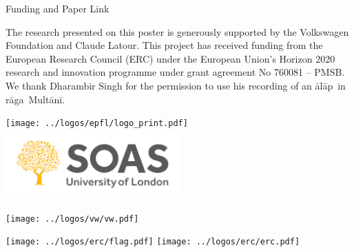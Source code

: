 \documentclass[final]{beamer}
\newcommand{\raga}{r\=aga}
\newcommand{\alap}{\=al\=ap}
\newcommand{\multani}{Mult\=an\=i}
\begin{document}
\begin{frame}[t]
\begin{columns}[t]
\begin{column}{0.25\textwidth}
      \begin{block}{Funding and Paper Link}
        \begin{figure}
          \begin{center}
          \end{center}
        \end{figure}
        \small
        The research presented on this poster is generously supported
        by the Volkswagen Foundation and Claude Latour.
        This project has received funding from the European Research Council (ERC)
        under the European Union's Horizon 2020 research and innovation programme
        under grant agreement No 760081 – PMSB.
        We thank Dharambir Singh for the permission to use his recording of an
        \alap\ in \raga\ \multani.

        \begin{adjustbox}{valign=m}
        \texttt{[image: ../logos/epfl/logo\_print.pdf]}
        \includegraphics[width=0.5\textwidth]{figures/soas.jpg}
        \end{adjustbox}

        \texttt{[image: ../logos/vw/vw.pdf]}

        \begin{adjustbox}{valign=m}
        \texttt{[image: ../logos/erc/flag.pdf]}
        \texttt{[image: ../logos/erc/erc.pdf]}
        \end{adjustbox}

        
      \end{block}
    \end{column}
    
  \end{columns}

  \vfill
  
\end{frame} %
\end{document}
